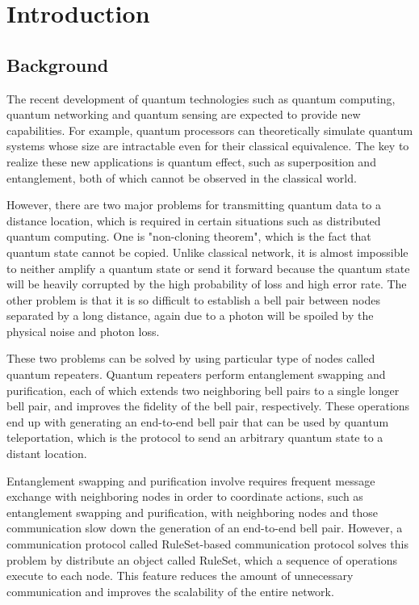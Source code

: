 \chapter{Introduction}
\label{introduction}

\section{Background}
\label{introduction:background} 

The recent development of quantum technologies such as quantum computing, quantum networking and quantum sensing are expected to provide new capabilities. 
For example, quantum processors can theoretically simulate quantum systems whose size are intractable even for their classical equivalence.
The key to realize these new applications is quantum effect, such as superposition and entanglement, both of which cannot be observed in the classical world.

However, there are two major problems for transmitting quantum data to a distance location, which is required in certain situations such as distributed quantum computing.
One is "non-cloning theorem", which is the fact that quantum state cannot be copied. Unlike classical network, it is almost impossible to neither amplify a quantum state or send it forward because the quantum state will be heavily corrupted by the high probability of loss and high error rate.
The other problem is that it is so difficult to establish a bell pair between nodes separated by a long distance, again due to a photon will be spoiled by the physical noise and photon loss.

These two problems can be solved by using particular type of nodes called quantum repeaters. Quantum repeaters perform entanglement swapping and purification, each of which extends two neighboring bell pairs to a single longer bell pair, and improves the fidelity of the bell pair, respectively.
These operations end up with generating an end-to-end bell pair that can be used by quantum teleportation, which is the protocol to send an arbitrary quantum state to a distant location. 

Entanglement swapping and purification involve requires frequent message exchange with neighboring nodes in order to coordinate actions, such as entanglement swapping and purification, with neighboring nodes and those communication slow down the generation of an end-to-end bell pair.
However, a communication protocol called RuleSet-based communication protocol solves this problem by distribute an object called RuleSet, which a sequence of operations execute to each node. This feature reduces the amount of unnecessary communication and improves the scalability of the entire network.

